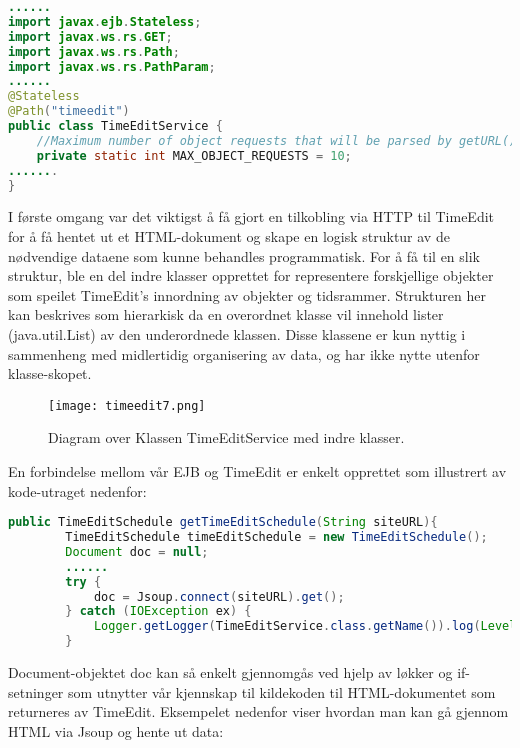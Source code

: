 \documentclass[../main.tex]{subfiles}
\begin{document}
\begin{lstlisting}[language=Java, frame=single, caption={Kodesnipp fra klassen TimeEditService, som er grovt kortet ned.}]
......
import javax.ejb.Stateless;
import javax.ws.rs.GET;
import javax.ws.rs.Path;
import javax.ws.rs.PathParam;
......
@Stateless
@Path("timeedit")
public class TimeEditService {
    //Maximum number of object requests that will be parsed by getURL()
    private static int MAX_OBJECT_REQUESTS = 10;
.......
}
\end{lstlisting}

I første omgang var det viktigst å få gjort en tilkobling via HTTP til TimeEdit for å få hentet ut et HTML-dokument og skape en logisk struktur av de nødvendige dataene som kunne behandles programmatisk. For å få til en slik struktur, ble en del indre klasser opprettet for representere forskjellige objekter som speilet TimeEdit’s innordning av objekter og tidsrammer. Strukturen her kan beskrives som hierarkisk da en overordnet klasse vil innehold lister (java.util.List) av den underordnede klassen. Disse klassene er kun nyttig i sammenheng med midlertidig organisering av data, og har ikke nytte utenfor klasse-skopet.

\begin{figure}[H]
\centering
                \texttt{[image: timeedit7.png]}
\caption{Diagram over Klassen TimeEditService med indre klasser.}
\end{figure}

En forbindelse mellom vår EJB og TimeEdit er enkelt opprettet som illustrert av kode-utraget nedenfor:

\begin{lstlisting}[language=Java, frame=single, caption={Et utdrag av en metode i TimeEditService som viser hvordan Jsoup benyttes for å hente ut ett enkelt dokument}]
public TimeEditSchedule getTimeEditSchedule(String siteURL){      
        TimeEditSchedule timeEditSchedule = new TimeEditSchedule();
        Document doc = null;
        ......
        try {
            doc = Jsoup.connect(siteURL).get();
        } catch (IOException ex) {
            Logger.getLogger(TimeEditService.class.getName()).log(Level.SEVERE, null, ex);
        }      
\end{lstlisting}

Document-objektet doc kan så enkelt gjennomgås ved hjelp av løkker og if-setninger som utnytter vår kjennskap til kildekoden til HTML-dokumentet som returneres av TimeEdit. Eksempelet nedenfor viser hvordan man kan gå gjennom HTML via Jsoup og hente ut data:
\end{document}

